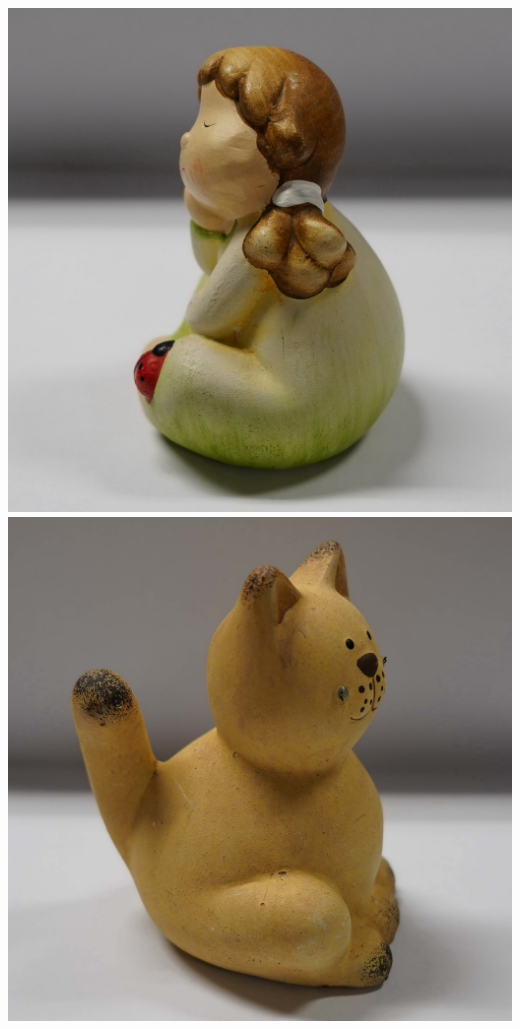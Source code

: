 \documentclass[landscape,a0paper,fontscale=0.292]{baposter}
\begin{document}
\begin{poster}
{\begin{minipage}[t]{0.49\textwidth}
\begin{minipage}[t]{0.58\textwidth}
\begin{center}
            \hfill
            \includegraphics[align=c,height=\realheight]{images/showcase/girl_left.jpg}
            \hfill
            \includegraphics[align=c,height=\realheight]{images/showcase/cat_right.jpg}

\end{center}
\end{minipage}
\end{minipage}}
\end{poster}
\end{document}
